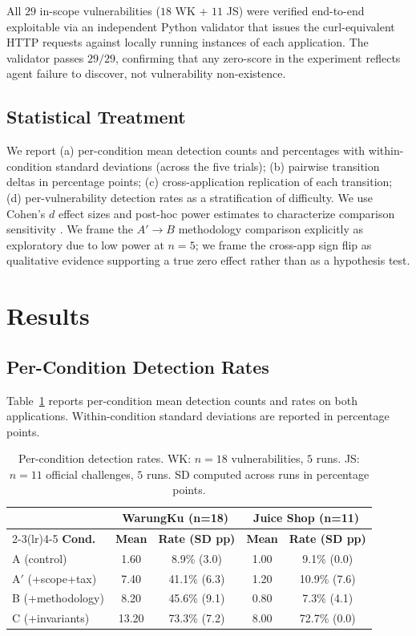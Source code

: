 \documentclass[conference]{IEEEtran}
\begin{document}
All $29$ in-scope vulnerabilities ($18$ WK + $11$ JS) were verified end-to-end exploitable via an independent Python validator that issues the curl-equivalent HTTP requests against locally running instances of each application. The validator passes $29/29$, confirming that any zero-score in the experiment reflects agent failure to discover, not vulnerability non-existence.

\subsection{Statistical Treatment}

We report (a) per-condition mean detection counts and percentages with within-condition standard deviations (across the five trials); (b) pairwise transition deltas in percentage points; (c) cross-application replication of each transition; (d) per-vulnerability detection rates as a stratification of difficulty. We use Cohen's $d$ effect sizes and post-hoc power estimates to characterize comparison sensitivity \cite{lakens2013effect, bowman2022underclaiming}. We frame the $A' \to B$ methodology comparison explicitly as exploratory due to low power at $n = 5$; we frame the cross-app sign flip as qualitative evidence supporting a true zero effect rather than as a hypothesis test.

\section{Results}
\label{sec:results}

\subsection{Per-Condition Detection Rates}

Table~\ref{tab:condition-rates} reports per-condition mean detection counts and rates on both applications. Within-condition standard deviations are reported in percentage points.

\begin{table}[t]
\centering
\caption{Per-condition detection rates. WK: $n=18$ vulnerabilities, $5$ runs. JS: $n=11$ official challenges, $5$ runs. SD computed across runs in percentage points.}
\label{tab:condition-rates}
\begin{tabular}{lcccc}
\toprule
& \multicolumn{2}{c}{\textbf{WarungKu (n=18)}} & \multicolumn{2}{c}{\textbf{Juice Shop (n=11)}} \\
\cmidrule(lr){2-3}\cmidrule(lr){4-5}
\textbf{Cond.} & \textbf{Mean} & \textbf{Rate (SD pp)} & \textbf{Mean} & \textbf{Rate (SD pp)} \\
\midrule
A (control)         & 1.60 & 8.9\% (3.0) & 1.00 & 9.1\% (0.0) \\
A$'$ (+scope+tax)   & 7.40 & 41.1\% (6.3) & 1.20 & 10.9\% (7.6) \\
B (+methodology)    & 8.20 & 45.6\% (9.1) & 0.80 & 7.3\% (4.1) \\
C (+invariants)     & 13.20 & 73.3\% (7.2) & 8.00 & 72.7\% (0.0) \\
\bottomrule
\end{tabular}
\end{table}
\end{document}
